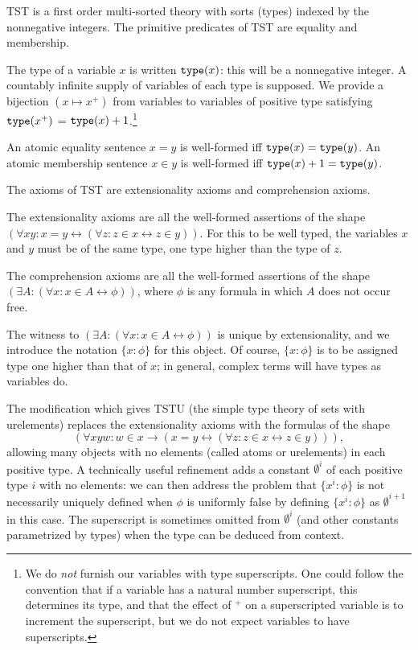 \documentclass{article}
\theoremstyle{definition}
\theoremstyle{remark}
\begin{document}
{TST is a first order multi-sorted theory with sorts (types) indexed by the nonnegative integers.  The primitive predicates of TST are equality and membership.

The type of a variable $x$ is written ${\tt type}(x)$:  this will be a nonnegative integer.   A countably infinite supply of variables of each type is supposed.   We provide a bijection $(x \mapsto x^+)$ from variables to variables of positive type satisfying   ${\tt type}(x^+)$ = ${\tt type}(x)+1$.\footnote{We do {\em not\/} furnish our variables with type superscripts.  One could follow the convention that if a variable has a natural number superscript, this determines its type, and that the effect of $^+$ on a superscripted variable is to increment the superscript, but we do not expect variables to have superscripts.}

An atomic equality sentence $x=y$ is well-formed iff ${\tt type}(x)={\tt type}(y)$. An atomic membership sentence $x \in y$ is well-formed iff ${\tt type}(x)+1 = {\tt type}(y)$.

The axioms of TST are extensionality axioms and comprehension axioms.

The extensionality axioms are all the well-formed assertions of the shape $(\forall xy:x=y \leftrightarrow (\forall z:z \in x \leftrightarrow z\in y))$.  For this to be well typed, the variables
$x$ and $y$ must be of the same type, one type higher than the type of $z$.

The comprehension axioms are all the well-formed assertions of the shape $(\exists A:(\forall x:x \in A \leftrightarrow \phi))$, where $\phi$ is any formula in which $A$ does not occur free.

The witness to $(\exists A:(\forall x:x \in A \leftrightarrow \phi))$ is unique by extensionality, and we introduce the notation $\{x:\phi\}$ for this object.  Of course, $\{x:\phi\}$  is to be assigned type one higher than that of $x$;  in general, complex terms will have types as variables do.

The modification which gives TSTU (the simple type theory of sets with urelements) replaces the extensionality axioms with the formulas of the shape $$(\forall xyw:w \in x \rightarrow (x=y \leftrightarrow (\forall z:z \in x \leftrightarrow z\in y))),$$  allowing many objects with no elements (called atoms or urelements)  in each positive type.  A technically useful refinement adds a constant $\emptyset^i$ of each positive type $i$ with no elements:  we can then address the problem that $\{x^i:\phi\}$ is not necessarily  uniquely defined when $\phi$ is uniformly false by defining $\{x^i:\phi\}$ as $\emptyset^{i+1}$ in this case.  The superscript is sometimes omitted from $\emptyset^i$ (and other constants parametrized by types) when the type can be deduced from context.

}
\end{document}

